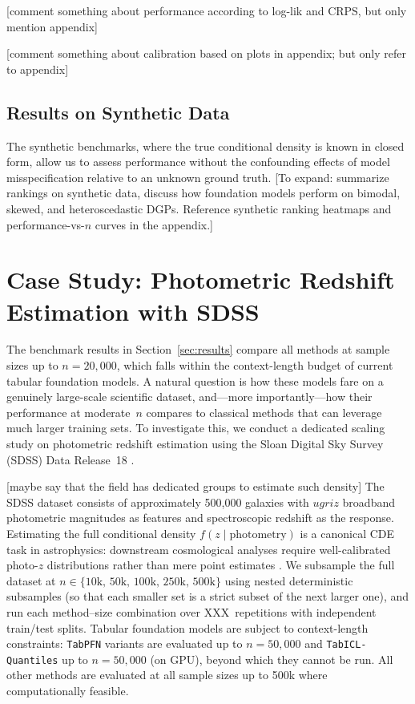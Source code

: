 \documentclass{article}
\newcommand{\method}[1]{\texttt{#1}}
\begin{document}
[comment something about performance according to log-lik and CRPS, but only mention appendix]
 
[comment something about calibration based on plots in appendix; but only refer to appendix]
 
\subsection{Results on Synthetic Data}
\label{sec:results_synthetic}
 
The synthetic benchmarks, where the true conditional density is known
in closed form, allow us to assess performance without the confounding
effects of model misspecification relative to an unknown ground truth.
[To expand: summarize rankings on synthetic data, discuss how
foundation models perform on bimodal, skewed, and heteroscedastic
DGPs.
Reference synthetic ranking heatmaps and performance-vs-$n$ curves
in the appendix.]
 
 

\section{Case Study: Photometric Redshift Estimation with SDSS}
\label{sec:sdss}
 
The benchmark results in Section~\ref{sec:results} compare all methods at
sample sizes up to $n = 20{,}000$, which falls within the context-length
budget of current tabular foundation models.
A natural question is how these models fare on a genuinely large-scale
scientific dataset, and---more importantly---how their performance at
moderate~$n$ compares to classical methods that can leverage much larger
training sets.
To investigate this, we conduct a dedicated scaling study on photometric
redshift estimation using the Sloan Digital Sky Survey (SDSS) Data
Release~18 \citep{sdss_dr18}.
 

[maybe say that the field has dedicated groups to estimate such density]
The SDSS dataset consists of approximately 500{,}000 galaxies with
$ugriz$ broadband photometric magnitudes as features and spectroscopic
redshift as the response.
Estimating the full conditional density $f(z \mid \text{photometry})$
is a canonical CDE task in astrophysics: downstream cosmological
analyses require well-calibrated photo-$z$ distributions rather than
mere point estimates \citep{schmidt2020evaluation,izbicki2017photo}.
We subsample the full dataset at
$n \in \{10\text{k},\, 50\text{k},\, 100\text{k},\, 250\text{k},\, 500\text{k}\}$
using nested deterministic subsamples (so that each smaller set is a
strict subset of the next larger one), and run each method--size
combination over XXX~repetitions with independent train/test splits.
Tabular foundation models are subject to context-length constraints:
\method{TabPFN} variants are evaluated up to $n = 50{,}000$ and
\method{TabICL-Quantiles} up to $n = 50{,}000$ (on GPU), beyond which
they cannot be run.
All other methods are evaluated at all sample sizes up to 500k where
computationally feasible.
\end{document}
